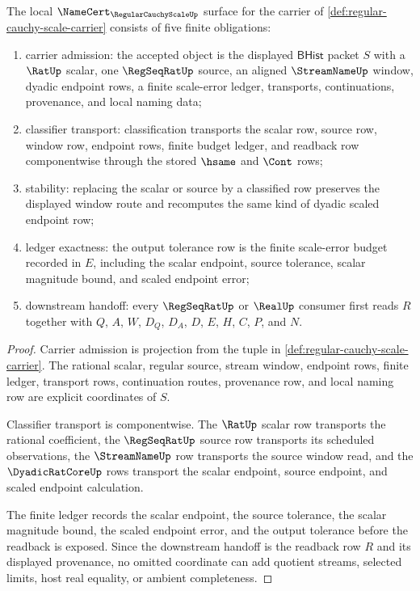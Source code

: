 \begin{theorem}
\label{thm:regular-cauchy-scale-namecert-obligations}
The local $\NameCert_{\RegularCauchyScaleUp}$ surface for the carrier of \autoref{def:regular-cauchy-scale-carrier} consists of five finite obligations:
\begin{enumerate}
\item carrier admission: the accepted object is the displayed $\mathsf{BHist}$ packet $S$ with a $\RatUp$ scalar, one $\RegSeqRatUp$ source, an aligned $\StreamNameUp$ window, dyadic endpoint rows, a finite scale-error ledger, transports, continuations, provenance, and local naming data;
\item classifier transport: classification transports the scalar row, source row, window row, endpoint rows, finite budget ledger, and readback row componentwise through the stored $\hsame$ and $\Cont$ rows;
\item stability: replacing the scalar or source by a classified row preserves the displayed window route and recomputes the same kind of dyadic scaled endpoint row;
\item ledger exactness: the output tolerance row is the finite scale-error budget recorded in $E$, including the scalar endpoint, source tolerance, scalar magnitude bound, and scaled endpoint error;
\item downstream handoff: every $\RegSeqRatUp$ or $\RealUp$ consumer first reads $R$ together with $Q$, $A$, $W$, $D_Q$, $D_A$, $D$, $E$, $H$, $C$, $P$, and $N$.
\end{enumerate}
\end{theorem}
\begin{proof}
Carrier admission is projection from the tuple in \autoref{def:regular-cauchy-scale-carrier}. The rational scalar, regular source, stream window, endpoint rows, finite ledger, transport rows, continuation routes, provenance row, and local naming row are explicit coordinates of $S$.

Classifier transport is componentwise. The $\RatUp$ scalar row transports the rational coefficient, the $\RegSeqRatUp$ source row transports its scheduled observations, the $\StreamNameUp$ row transports the source window read, and the $\DyadicRatCoreUp$ rows transport the scalar endpoint, source endpoint, and scaled endpoint calculation.

The finite ledger records the scalar endpoint, the source tolerance, the scalar magnitude bound, the scaled endpoint error, and the output tolerance before the readback is exposed. Since the downstream handoff is the readback row $R$ and its displayed provenance, no omitted coordinate can add quotient streams, selected limits, host real equality, or ambient completeness.
\end{proof}

